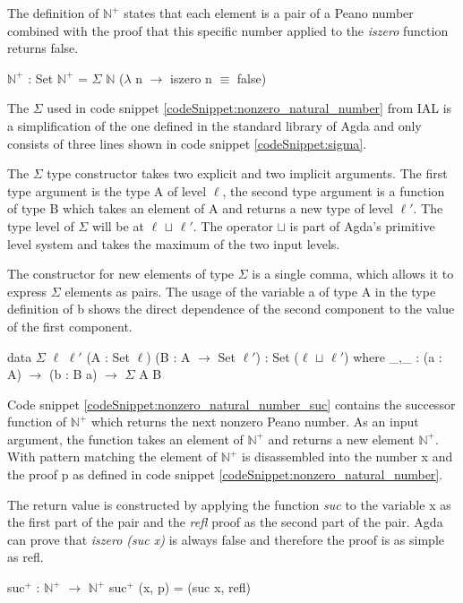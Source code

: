 The definition of $\mathbb{N}^+$ states that each element is a pair of a Peano number combined with the proof that this specific number applied to the \emph{iszero} function returns false.

\begin{codesnippet}[mathescape=true, caption={Definition of nonzero Peano numbers in Agda}, label={codeSnippet:nonzero_natural_number}]
$\mathbb{N}^+$ : Set
$\mathbb{N}^+$ = $\Sigma$ $\mathbb{N}$ ($\lambda$ n $\rightarrow$ iszero n $\equiv$ false)
\end{codesnippet}

The $\Sigma$ used in code snippet \ref{codeSnippet:nonzero_natural_number} from IAL is a simplification of the one defined in the standard library of Agda and only consists of three lines shown in code snippet \ref{codeSnippet:sigma}.

The $\Sigma$ type constructor takes two explicit and two implicit arguments. 
The first type argument is the type A of level $\ell$, the second type argument is a function of type B which takes an element of A and returns a new type of level $\ell '$.
The type level of $\Sigma$ will be at $\ell$ $\sqcup$ $\ell '$. The operator $\sqcup$ is part of Agda's primitive level system and takes the maximum of the two input levels.

The constructor for new elements of type $\Sigma$ is a single comma, which allows it to express $\Sigma$ elements as pairs.
The  usage of the variable a of type A in the type definition of b shows the direct dependence of the second component to the value of the first component.

\begin{codesnippet}[mathescape=true, caption={Definition of $\Sigma$ in Agda}, label={codeSnippet:sigma}]
data $\Sigma$ {$\ell$ $\ell '$} (A : Set $\ell$) (B : A $\rightarrow$ Set $\ell '$)
 : Set ($\ell$ $\sqcup$ $\ell '$) where
_,_ : (a : A) $\rightarrow$ (b : B a) $\rightarrow$ $\Sigma$ A B
\end{codesnippet}

Code snippet \ref{codeSnippet:nonzero_natural_number_suc} contains the successor function of $\mathbb{N}^+$ which returns the next nonzero Peano number.
As an input argument, the function takes an element of $\mathbb{N}^+$ and returns a new element $\mathbb{N}^+$. 
With pattern matching the element of $\mathbb{N}^+$ is disassembled into the number x and the proof p as defined in code snippet \ref{codeSnippet:nonzero_natural_number}.

The return value is constructed by applying the function \emph{suc} to the variable x as the first part of the pair and the \emph{refl} proof as the second part of the pair.
Agda can prove that \emph{iszero (suc x)} is always false and therefore the proof is as simple as refl.

\begin{codesnippet}[mathescape=true, caption={Successor of $\mathbb{N}^+$}, label={codeSnippet:nonzero_natural_number_suc}]
suc$^+$ : $\mathbb{N}^+$ $\rightarrow$ $\mathbb{N}^+$
suc$^+$ (x, p) = (suc x, refl)
\end{codesnippet}